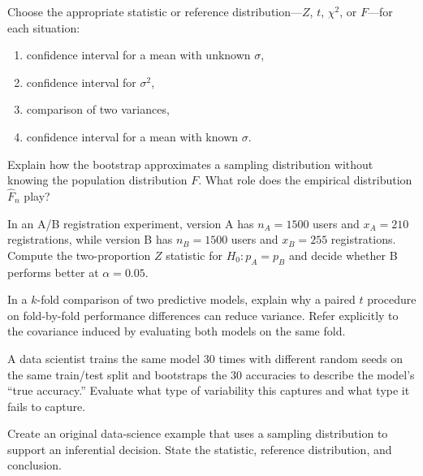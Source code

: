 \begin{problema}\label{prob:9f56f56}
Choose the appropriate statistic or reference distribution---$Z$, $t$, $\chi^2$, or $F$---for each situation:
\begin{enumerate}[label=(\alph*)]
	\item confidence interval for a mean with unknown $\sigma$,
	\item confidence interval for $\sigma^2$,
	\item comparison of two variances,
	\item confidence interval for a mean with known $\sigma$.
\end{enumerate}
\end{problema}

\begin{problema}\label{prob:56afb0b}
Explain how the bootstrap approximates a sampling distribution without knowing the population distribution $F$. What role does the empirical distribution $\hat F_n$ play?
\end{problema}

\begin{problema}\label{prob:f78153c}
In an A/B registration experiment, version A has $n_A=1500$ users and $x_A=210$ registrations, while version B has $n_B=1500$ users and $x_B=255$ registrations. Compute the two-proportion $Z$ statistic for $H_0:p_A=p_B$ and decide whether B performs better at $\alpha=0.05$.
\end{problema}

\begin{problema}\label{prob:4d90cdd}
In a $k$-fold comparison of two predictive models, explain why a paired $t$ procedure on fold-by-fold performance differences can reduce variance. Refer explicitly to the covariance induced by evaluating both models on the same fold.
\end{problema}

\begin{problema}\label{prob:cf54ef8}
A data scientist trains the same model $30$ times with different random seeds on the same train/test split and bootstraps the $30$ accuracies to describe the model's ``true accuracy.'' Evaluate what type of variability this captures and what type it fails to capture.
\end{problema}

\begin{problema}\label{prob:7d50e57}
Create an original data-science example that uses a sampling distribution to support an inferential decision. State the statistic, reference distribution, and conclusion.
\end{problema}


